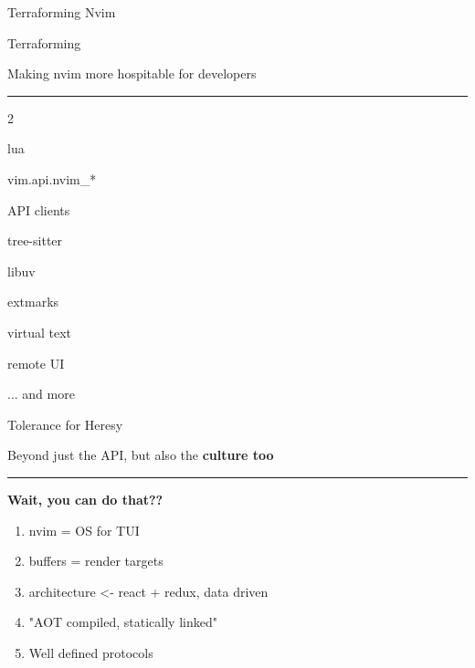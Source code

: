 \documentclass{beamer}
\begin{document}
\begin{frame}{Terraforming Nvim}
	
	\begin{block}{Terraforming}

		\vspace{0.5em}

		Making nvim more hospitable for developers

		\vspace{0.5em}

	\end{block}

	\rule{\textwidth}{0.1em}

	\begin{itemize}


	\end{itemize}

	... and more 

\end{frame}


\begin{frame}{Tolerance for Heresy}

	Beyond just the API, but also the \textbf{culture too}

	\rule{\textwidth}{0.1em}

	\textbf{Wait, you can do that??}

	\begin{enumerate}

		\item nvim = OS for TUI

		\item buffers = render targets

		\item architecture <- react + redux, data driven

		\item "AOT compiled, statically linked"

		\item Well defined protocols

	\end{enumerate}

\end{frame}
\end{document}

